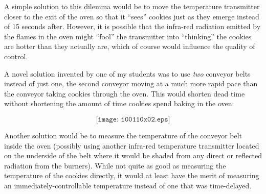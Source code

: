 \vskip 10pt

A simple solution to this dilemma would be to move the temperature transmitter closer to the exit of the oven so that it ``sees'' cookies just as they emerge instead of 15 seconds after.  However, it is possible that the infra-red radiation emitted by the flames in the oven might ``fool'' the transmitter into ``thinking'' the cookies are hotter than they actually are, which of course would influence the quality of control.

A novel solution invented by one of my students was to use {\it two} conveyor belts instead of just one, the second conveyor moving at a much more rapid pace than the conveyor taking cookies through the oven.  This would shorten dead time without shortening the amount of time cookies spend baking in the oven:

$$\texttt{[image: i00110x02.eps]}$$

Another solution would be to measure the temperature of the conveyor belt inside the oven (possibly using another infra-red temperature transmitter located on the underside of the belt where it would be shaded from any direct or reflected radiation from the burners).  While not quite as good as measuring the temperature of the cookies directly, it would at least have the merit of measuring an immediately-controllable temperature instead of one that was time-delayed.




